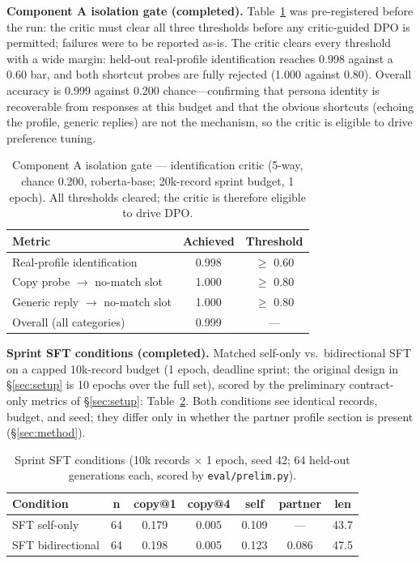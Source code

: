 \documentclass[lettersize,journal]{IEEEtran}
\begin{document}
\textbf{Component A isolation gate (completed).} Table~\ref{tab:gate} was
pre-registered before the run: the critic must clear all three thresholds
before any critic-guided DPO is permitted; failures were to be reported
as-is. The critic clears every threshold with a wide margin: held-out
real-profile identification reaches 0.998 against a 0.60 bar, and both
shortcut probes are fully rejected (1.000 against 0.80). Overall accuracy is
0.999 against 0.200 chance---confirming that persona identity is recoverable
from responses at this budget and that the obvious shortcuts (echoing the
profile, generic replies) are not the mechanism, so the critic is eligible to
drive preference tuning.

\begin{table}[!t]
\caption{Component A isolation gate — identification critic (5-way, chance
0.200, roberta-base; 20k-record sprint budget, 1 epoch). All thresholds
cleared; the critic is therefore eligible to drive DPO.}
\label{tab:gate}
\centering
\footnotesize
\begin{tabular}{lcc}
\hline
Metric & Achieved & Threshold \\
\hline
Real-profile identification & 0.998 & $\geq$ 0.60 \\
Copy probe $\to$ no-match slot & 1.000 & $\geq$ 0.80 \\
Generic reply $\to$ no-match slot & 1.000 & $\geq$ 0.80 \\
Overall (all categories) & 0.999 & --- \\
\hline
\end{tabular}
\end{table}

\textbf{Sprint SFT conditions (completed).} Matched self-only vs.\
bidirectional SFT on a capped 10k-record budget (1 epoch, deadline sprint;
the original design in \S\ref{sec:setup} is 10 epochs over the full set),
scored by the preliminary contract-only metrics of \S\ref{sec:setup}:
Table~\ref{tab:sprint}. Both conditions see identical records, budget, and
seed; they differ only in whether the partner profile section is present
(\S\ref{sec:method}).

\begin{table}[!t]
\caption{Sprint SFT conditions (10k records $\times$ 1 epoch, seed 42;
64 held-out generations each, scored by \texttt{eval/prelim.py}).}
\label{tab:sprint}
\centering
\scriptsize
\setlength{\tabcolsep}{4pt}%
\begin{tabular}{lcccccc}
\hline
Condition & n & copy@1 & copy@4 & self & partner & len \\
\hline
SFT self-only & 64 & 0.179 & 0.005 & 0.109 & --- & 43.7 \\
SFT bidirectional & 64 & 0.198 & 0.005 & 0.123 & 0.086 & 47.5 \\
\hline
\end{tabular}
\end{table}
\end{document}
